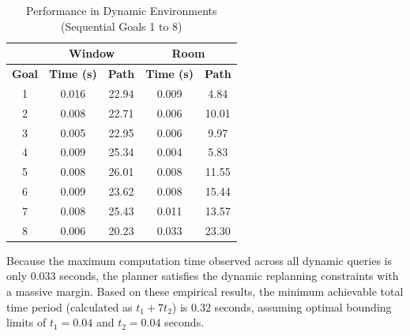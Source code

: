 \documentclass[letterpaper,journal]{IEEEtran}
\begin{document}
\begin{table}[htbp]
    \caption{Performance in Dynamic Environments (Sequential Goals 1 to 8)}
    \begin{center}
        \begin{tabular}{|c|c|c|c|c|}
            \hline
                          & \multicolumn{2}{c|}{\textbf{Window}} & \multicolumn{2}{c|}{\textbf{Room}}                                     \\
            \hline
            \textbf{Goal} & \textbf{Time (s)}                    & \textbf{Path}                      & \textbf{Time (s)} & \textbf{Path} \\
            \hline
            1             & 0.016                                & 22.94                              & 0.009             & 4.84          \\
            \hline
            2             & 0.008                                & 22.71                              & 0.006             & 10.01         \\
            \hline
            3             & 0.005                                & 22.95                              & 0.006             & 9.97          \\
            \hline
            4             & 0.009                                & 25.34                              & 0.004             & 5.83          \\
            \hline
            5             & 0.008                                & 26.01                              & 0.008             & 11.55         \\
            \hline
            6             & 0.009                                & 23.62                              & 0.008             & 15.44         \\
            \hline
            7             & 0.008                                & 25.43                              & 0.011             & 13.57         \\
            \hline
            8             & 0.006                                & 20.23                              & 0.033             & 23.30         \\
            \hline
        \end{tabular}
        \label{tab:dynamic_results}
    \end{center}
\end{table}

Because the maximum computation time observed across all dynamic queries is only 0.033 seconds, the planner satisfies the dynamic replanning constraints with a massive margin. Based on these empirical results, the minimum achievable total time period (calculated as $t_1 + 7t_2$) is $0.32$ seconds, assuming optimal bounding limits of $t_1 = 0.04$ and $t_2 = 0.04$ seconds.
\end{document}
